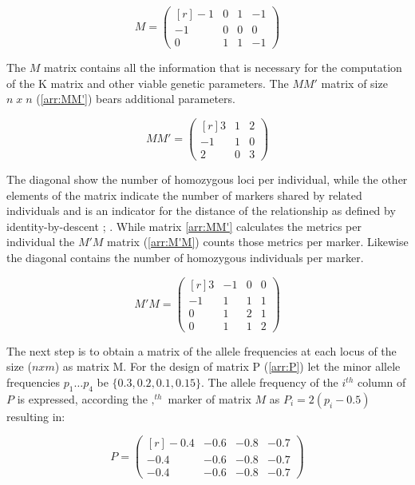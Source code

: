 \begin{equation}
 M = 
 \begin{pmatrix}[r]
  -1 & 0 & 1 & -1 \\
  -1 & 0 & 0 & 0 \\
   0 & 1 & 1 & -1 
 \end{pmatrix}
 \label{arr:M}
\end{equation}

The $M$ matrix contains all the information that is necessary for the computation of the K matrix and other viable genetic parameters. The $MM'$ matrix of size $n\; x\; n$ (\ref{arr:MM'}) bears additional parameters.

\begin{equation}
 MM' = 
 \begin{pmatrix}[r]
  3 & 1 & 2 \\
  -1 & 1 & 0 \\
  2 & 0 & 3 
 \end{pmatrix}
 \label{arr:MM'}
\end{equation}


The diagonal show the number of homozygous loci per individual, while the other elements of the matrix
indicate the number of markers shared by related individuals and is an indicator for the distance of the
relationship as defined by identity-by-descent \cite{vanraden2008efficient}; \cite{misztal2013methods}. While
matrix \ref{arr:MM'} calculates the metrics per individual the $M'M$ matrix (\ref{arr:M'M}) counts those
metrics per marker. Likewise the diagonal contains the number of homozygous individuals per marker.

\begin{equation}
 M'M = 
 \begin{pmatrix}[r]
  3 & -1 & 0 & 0 \\
  -1 & 1 & 1 & 1 \\
  0 & 1 & 2 & 1 \\
  0 & 1 & 1 & 2 
 \end{pmatrix}
 \label{arr:M'M}
\end{equation}

The next step is to obtain a matrix of the allele frequencies at each locus of the size ($n x m$) as matrix
M. For the design of matrix P (\ref{arr:P}) let the minor allele frequencies $p_1 \dots p_4$ be
$\{0.3, 0.2, 0.1, 0.15\}$. The allele frequency of the $i^{th}$ column of $P$ is expressed, according the $,^{th}$ marker of matrix $M$ as $P_i = 2(p_i - 0.5)$ resulting in: 

\begin{equation}
 P = 
 \begin{pmatrix}[r]
  -0.4 & -0.6 & -0.8 & -0.7 \\
  -0.4 & -0.6 & -0.8 & -0.7 \\
  -0.4 & -0.6 & -0.8 & -0.7
 \end{pmatrix}
 \label{arr:P}
\end{equation}

